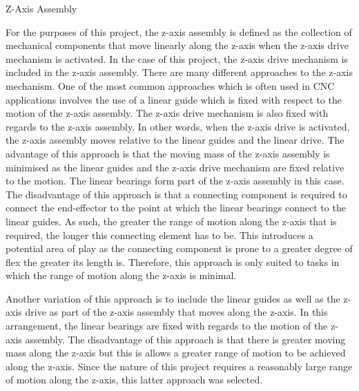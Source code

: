 Z-Axis Assembly

For the purposes of this project, the z-axis assembly is defined as the collection of mechanical components that move linearly along the z-axis when the z-axis drive mechanism is activated. In the case of this project, the z-axis drive mechanism is included in the z-axis assembly. There are many different approaches to the z-axis mechanism. One of the most common approaches which is often used in CNC applications involves the use of a linear guide which is fixed with respect to the motion of the z-axis assembly. The z-axis drive mechanism is also fixed with regards to the z-axis assembly. In other words, when the z-axis drive is activated, the z-axis assembly moves relative to the linear guides and the linear drive. The advantage of this approach is that the moving mass of the z-axis assembly is minimised as the linear guides and the z-axis drive mechanism are fixed relative to the motion. The linear bearings form part of the z-axis assembly in this case. The disadvantage of this approach is that a connecting component is required to connect the end-effector to the point at which the linear bearings connect to the linear guides. As such, the greater the range of motion along the z-axis that is required, the longer this connecting element has to be. This introduces a potential area of play as the connecting component is prone to a greater degree of flex the greater its length is. Therefore, this approach is only suited to tasks in which the range of motion along the z-axis is minimal.

Another variation of this approach is to include the linear guides as well as the z-axis drive as part of the z-axis assembly that moves along the z-axis. In this arrangement, the linear bearings are fixed with regards to the motion of the z-axis assembly. The disadvantage of this approach is that there is greater moving mass along the z-axis but this is allows a greater range of motion to be achieved along the z-axis. Since the nature of this project requires a reasonably large range of motion along the z-axis, this latter approach was selected.

